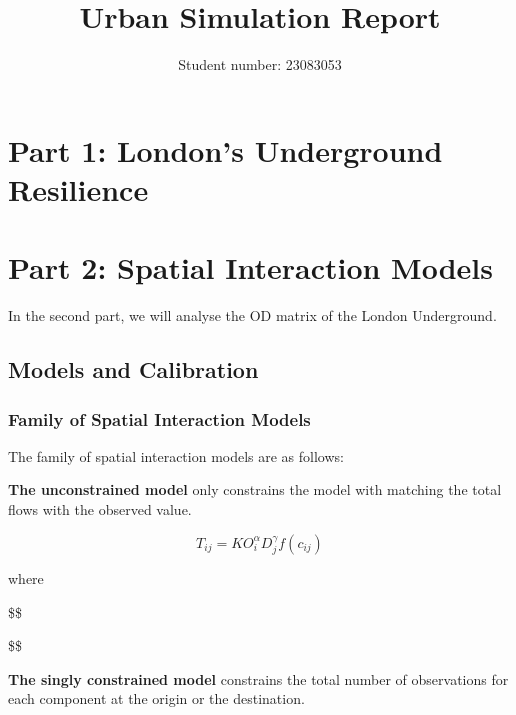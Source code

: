 \documentclass[
  12pt,
  a4paper,
  DIV=11,
  numbers=noendperiod]{scrartcl}
\title{Urban Simulation Report}
\author{Student number: 23083053}
\date{}
\begin{document}
\maketitle
\ifdefined\Shaded\renewenvironment{Shaded}{\begin{tcolorbox}[breakable, interior hidden, boxrule=0pt, frame hidden, borderline west={3pt}{0pt}{shadecolor}, sharp corners, enhanced]}{\end{tcolorbox}}\fi

\hypertarget{part-1-londons-underground-resilience}{%
\section{Part 1: London's Underground
Resilience}\label{part-1-londons-underground-resilience}}

\hypertarget{part-2-spatial-interaction-models}{%
\section{Part 2: Spatial Interaction
Models}\label{part-2-spatial-interaction-models}}

In the second part, we will analyse the OD matrix of the London
Underground.

\hypertarget{models-and-calibration}{%
\subsection{Models and Calibration}\label{models-and-calibration}}

\hypertarget{family-of-spatial-interaction-models}{%
\subsubsection{Family of Spatial Interaction
Models}\label{family-of-spatial-interaction-models}}

The family of spatial interaction models are as follows:

\textbf{The unconstrained model} only constrains the model with matching
the total flows with the observed value.

\[
T_{ij} = K O^{\alpha}_i D^{\gamma}_j f(c_{ij})
\]

where

\$\$

\$\$

\textbf{The singly constrained model} constrains the total number of
observations for each component at the origin or the destination.
\end{document}
